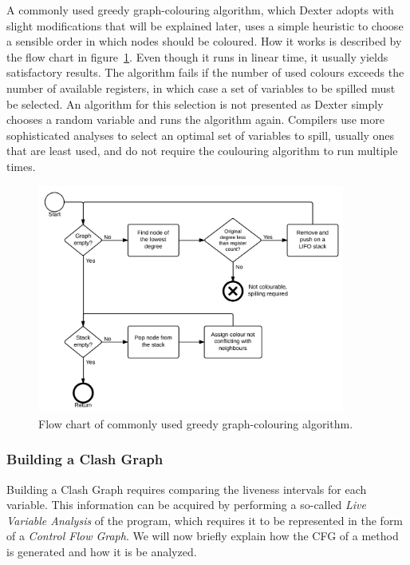 \documentclass[12pt,twoside,notitlepage]{report}
\begin{document}
A commonly used greedy graph-colouring algorithm, which Dexter adopts with slight modifications that will be explained later, uses a simple heuristic to choose a sensible order in which nodes should be coloured. How it works is described by the flow chart in figure~\ref{fig:Implementation_GraphColouring}. Even though it runs in linear time, it usually yields satisfactory results. The algorithm fails if the number of used colours exceeds the number of available registers, in which case a set of variables to be spilled must be selected. An algorithm for this selection is not presented as Dexter simply chooses a random variable and runs the algorithm again. Compilers use more sophisticated analyses to select an optimal set of variables to spill, usually ones that are least used, and do not require the coulouring algorithm to run multiple times.

\begin{figure}
	\centerline{	
		\includegraphics[width=0.9\textwidth]{figs/fig_implementation_gc.png}
	}
	\caption{Flow chart of commonly used greedy graph-colouring algorithm.}
	\label{fig:Implementation_GraphColouring}
\end{figure}

\subsubsection{Building a Clash Graph}

Building a Clash Graph requires comparing the liveness intervals for each variable. This information can be acquired by performing a so-called \emph{Live Variable Analysis} of the program, which requires it to be represented in the form of a \emph{Control Flow Graph}. We will now briefly explain how the CFG of a method is generated and how it is be analyzed.
\end{document}
